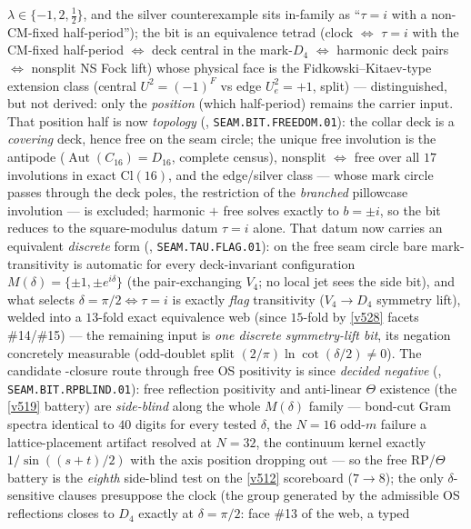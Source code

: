 \documentclass[11pt,a4paper]{article}
\begin{document}
\begin{keybox}
$\lambda\in\{-1,2,\tfrac12\}$, and the silver counterexample sits in-family as ``$\tau=i$ with a
non-CM-fixed half-period''); the bit is an equivalence tetrad (clock $\iff$ $\tau{=}i$ with the
CM-fixed half-period $\iff$ deck central in the mark-$D_4$ $\iff$ harmonic deck pairs $\iff$
nonsplit NS Fock lift) whose physical face is the Fidkowski--Kitaev-type extension class (central
$U^2=(-1)^F$ vs edge $U_e^2=+1$, split) --- distinguished, but not derived: only the
\emph{position} (which half-period) remains the carrier input. That position half is now
\emph{topology} (, \texttt{SEAM.BIT.FREEDOM.01}): the collar deck
is a \emph{covering} deck, hence free on the seam circle; the unique free involution is the antipode
($\operatorname{Aut}(C_{16})=D_{16}$, complete census), nonsplit $\iff$ free over all $17$
involutions in exact $\mathrm{Cl}(16)$, and the edge/silver class --- whose mark circle passes
through the deck poles, the restriction of the \emph{branched} pillowcase involution --- is
excluded; harmonic $+$ free solves exactly to $b=\pm i$, so the bit reduces to the square-modulus
datum $\tau=i$ alone. That datum now carries an equivalent \emph{discrete} form
(, \texttt{SEAM.TAU.FLAG.01}): on the free seam circle bare
mark-transitivity is automatic for every deck-invariant configuration $M(\delta)=\{\pm1,\pm
e^{i\delta}\}$ (the pair-exchanging $V_4$; no local jet sees the side bit), and what selects
$\delta=\pi/2\iff\tau=i$ is exactly \emph{flag} transitivity ($V_4\to D_4$ symmetry lift), welded
into a $13$-fold exact equivalence web (since $15$-fold by \vref{v528} facets \#14/\#15) --- the remaining input is \emph{one discrete symmetry-lift
bit}, its negation concretely measurable (odd-doublet split $(2/\pi)\ln\cot(\delta/2)\neq0$).
The candidate \mE-closure route through free OS positivity is since \emph{decided negative}
(, \texttt{SEAM.BIT.RPBLIND.01}): free reflection positivity
and anti-linear $\Theta$ existence (the \vref{v519} battery) are \emph{side-blind} along the whole
$M(\delta)$ family --- bond-cut Gram spectra identical to $40$ digits for every tested $\delta$,
the $N=16$ odd-$m$ failure a lattice-placement artifact resolved at $N=32$, the continuum kernel
exactly $1/\sin((s{+}t)/2)$ with the axis position dropping out --- so the free RP/$\Theta$ battery
is the \emph{eighth} side-blind test on the \vref{v512} scoreboard ($7\to8$); the only
$\delta$-sensitive clauses presuppose the clock (the group generated by the admissible OS
reflections closes to $D_4$ exactly at $\delta=\pi/2$: face \#13 of the web, a typed \mC\

\end{keybox}
\end{document}
